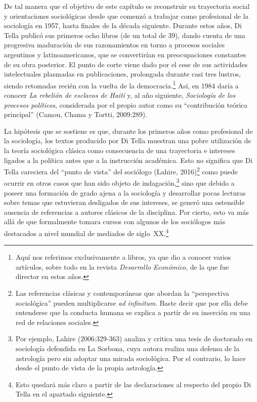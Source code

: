 De tal manera que el objetivo de este capítulo es reconstruir su trayectoria social y orientaciones sociológicas desde que comenzó a trabajar como profesional de la sociología en 1957, hasta finales de la década siguiente. Durante estos años, Di Tella publicó sus primeros ocho libros (de un total de 39), dando cuenta de una progresiva maduración de sus razonamientos en torno a procesos sociales argentinos y latinoamericanos, que se convertirían en preocupaciones constantes de su obra posterior. El punto de corte viene dado por el cese de sus actividades intelectuales plasmadas en publicaciones, prolongada durante casi tres lustros, siendo retomadas recién con la vuelta de la democracia.\footnote{Aquí nos referimos exclusivamente a libros, ya que dio a conocer varios artículos, sobre todo en la revista \emph{Desarrollo Económico}, de la que fue director en estos años.} Así, en 1984 daría a conocer \emph{La rebelión de esclavos de Haití} y, al año siguiente, \emph{Sociología de los procesos políticos}, considerada por el propio autor como su \enquote{contribución teórica principal} (Camou, Chama y Tortti, 2009:289).

La hipótesis que se sostiene es que, durante los primeros años como profesional de la sociología, los textos producido por Di Tella muestran una pobre utilización de la teoría sociológica clásica como consecuencia de una trayectoria e intereses ligados a la política antes que a la instrucción académica. Esto no significa que Di Tella careciera del \enquote{punto de vista} del sociólogo \parencite{1516-ALEXANDER2008,1522-BAUMAN2007}(Lahire, 2016)\footnote{Las referencias clásicas y contemporáneas que abordan la \enquote{perspectiva sociológica} pueden multiplicarse \emph{ad infinitum}. Baste decir que por ella debe entenderse que la conducta humana se explica a partir de su inserción en una red de relaciones sociales.} como puede ocurrir en otros casos que han sido objeto de indagación,\footnote{Por ejemplo, Lahire (2006:329-363) analiza y critica una tesis de doctorado en sociología defendida en La Sorbona, cuya autora realiza una defensa de la astrología pero sin adoptar una mirada sociológica. Por el contrario, lo hace desde el punto de vista de la propia astrología.} sino que debido a poseer una formación de grado ajena a la sociología y desarrollar pocas lecturas sobre temas que estuvieran desligados de sus intereses, se generó una ostensible ausencia de referencias a autores clásicos de la disciplina. Por cierto, esto va más allá de que formalmente tomara cursos con algunos de los sociólogos más destacados a nivel mundial de mediados de siglo~XX.\footnote{Esto quedará más claro a partir de las declaraciones al respecto del propio Di Tella en el apartado siguiente.}

